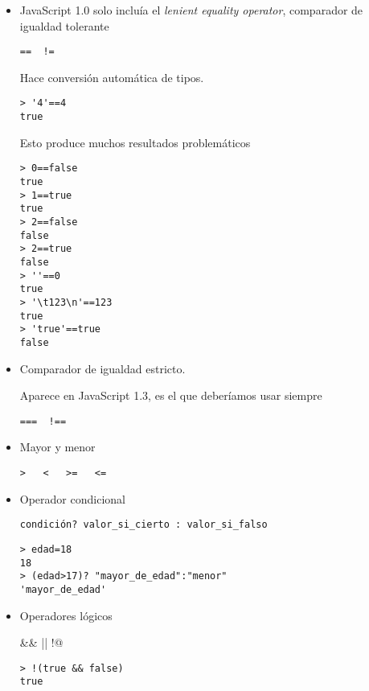 \documentclass[ucs]{beamer}
\begin{document}
\begin{frame}[fragile]

    \begin{itemize}
    \item
JavaScript 1.0 solo incluía el 
\emph{lenient equality operator},
comparador de igualdad tolerante 

\verb|==  !=|

Hace conversión automática de tipos.
  \begin{scriptsize}
  \begin{verbatim}
> '4'==4
true
  \end{verbatim}
  \end{scriptsize}
Esto produce muchos resultados problemáticos
  \begin{scriptsize}
  \begin{verbatim}
> 0==false
true
> 1==true
true
> 2==false
false
> 2==true
false
> ''==0
true
> '\t123\n'==123
true
> 'true'==true
false
  \end{verbatim}
  \end{scriptsize}

    \end{itemize}
\end{frame}


\begin{frame}[fragile]

    \begin{itemize}
    \item
Comparador de igualdad estricto.

Aparece en JavaScript 1.3,  es
el que deberíamos usar siempre 

\verb|===  !==|

    \item
Mayor y menor

\verb|>   <   >=   <=|
    \item
Operador condicional

\verb|condición? valor_si_cierto : valor_si_falso|

  \begin{scriptsize}
  \begin{verbatim}
> edad=18
18
> (edad>17)? "mayor_de_edad":"menor"
'mayor_de_edad'
  \end{verbatim}
  \end{scriptsize}
    \item
Operadores lógicos

\verb@&&  ||   !@

  \begin{scriptsize}
  \begin{verbatim}
> !(true && false)
true
  \end{verbatim}
  \end{scriptsize}

    \end{itemize}

\end{frame}
\end{document}

